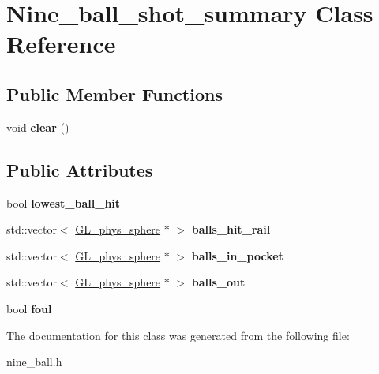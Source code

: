 \hypertarget{class_nine__ball__shot__summary}{
\section{Nine\_\-ball\_\-shot\_\-summary Class Reference}
\label{class_nine__ball__shot__summary}
}
\subsection*{Public Member Functions}
\begin{DoxyCompactItemize}
\item 
\hypertarget{class_nine__ball__shot__summary_a0498d1ee50a5fe4da0726bb311c111fa}{
void {\bfseries clear} ()}
\label{class_nine__ball__shot__summary_a0498d1ee50a5fe4da0726bb311c111fa}

\end{DoxyCompactItemize}
\subsection*{Public Attributes}
\begin{DoxyCompactItemize}
\item 
\hypertarget{class_nine__ball__shot__summary_aba69cbfd94213f3a3284d89c4013112a}{
bool {\bfseries lowest\_\-ball\_\-hit}}
\label{class_nine__ball__shot__summary_aba69cbfd94213f3a3284d89c4013112a}

\item 
\hypertarget{class_nine__ball__shot__summary_a764dbaab4ac00ffacf4ce058d19aaa6a}{
std::vector$<$ \hyperlink{class_g_l__phys__sphere}{GL\_\-phys\_\-sphere} $\ast$ $>$ {\bfseries balls\_\-hit\_\-rail}}
\label{class_nine__ball__shot__summary_a764dbaab4ac00ffacf4ce058d19aaa6a}

\item 
\hypertarget{class_nine__ball__shot__summary_a4d330fa371de9bccbb0b3519952816db}{
std::vector$<$ \hyperlink{class_g_l__phys__sphere}{GL\_\-phys\_\-sphere} $\ast$ $>$ {\bfseries balls\_\-in\_\-pocket}}
\label{class_nine__ball__shot__summary_a4d330fa371de9bccbb0b3519952816db}

\item 
\hypertarget{class_nine__ball__shot__summary_a339bc7a193adf999351739a1c4814f0f}{
std::vector$<$ \hyperlink{class_g_l__phys__sphere}{GL\_\-phys\_\-sphere} $\ast$ $>$ {\bfseries balls\_\-out}}
\label{class_nine__ball__shot__summary_a339bc7a193adf999351739a1c4814f0f}

\item 
\hypertarget{class_nine__ball__shot__summary_a91de4e82a5616d7e6b56328330be2cd6}{
bool {\bfseries foul}}
\label{class_nine__ball__shot__summary_a91de4e82a5616d7e6b56328330be2cd6}

\end{DoxyCompactItemize}


The documentation for this class was generated from the following file:\begin{DoxyCompactItemize}
\item 
nine\_\-ball.h\end{DoxyCompactItemize}

